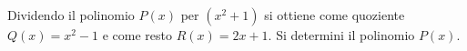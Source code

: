 Dividendo il polinomio $P(x)$ per $(x^2 + 1)$ si ottiene
come quoziente $Q(x) = x^2 - 1$ e come resto $R(x) = 2x + 1$. 
Si determini il polinomio $P(x)$.
